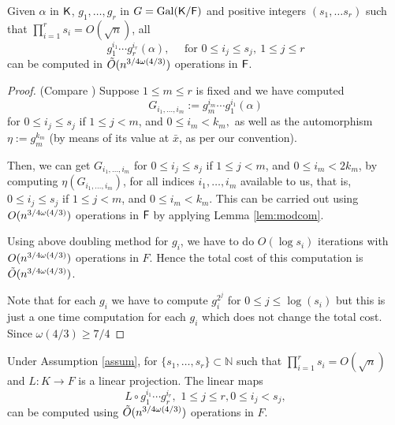 \begin{lemma}\label{lem:selfcomp}
Given $\alpha$ in ${\mathsf{K}}$, $g_1, \ldots , g_{r}$ in $G =
\mathrm{Gal}({\mathsf{K}}/{\mathsf{F}})$ and positive integers $(s_1, \ldots s_r)$ such
that $\prod_{i = 1}^r s_i = O(\sqrt{n})$, all
  $$g_1^{i_1}\cdots g_r^{i_r}(\alpha) ,\quad \text{~for~} 0 \leq i_j
\leq s_j,\ 1 \leq j \leq r$$ can be computed in $\tilde{O}(n^{3/4 \omega(4/3)})$
operations in ${\mathsf{F}}$.
\end{lemma}
\begin{proof}
(Compare \cite[Lemma~4]{KalSho98}) Suppose $1 \leq m \leq r$ is
  fixed and we have computed 
$$G_{i_1,\dots,i_m}:=g_m^{i_m}\cdots g_1^{i_1}(\alpha)$$ for $0 \leq
  i_j \leq s_j$ if $1 \leq j < m$, and $0 \leq i_m < k_m,$ as well as
  the automorphism $\eta:=g_m^{k_m}$ (by means of its value at $\bar
  x$, as per our convention).
  
 Then, we can get $G_{i_1,\dots,i_m}$ for $0 \leq i_j \leq s_j$ if $1
 \leq j < m$, and $0 \leq i_m < 2k_m$, by computing
 $\eta(G_{i_1,\dots,i_m})$, for all indices $i_1,\dots,i_m$
 available to us, that is, $0 \leq i_j \leq s_j$ if $1 \leq j < m$,
 and $0 \leq i_m < k_m$. This can be carried out using $O(n^{3/4 \omega(4/3)})$
 operations in ${\mathsf{F}}$ by applying Lemma \ref{lem:modcom}.

 Using above doubling method for $g_i$, we have to
 do $O(\log s_i)$ iterations with $O(n^{3/4 \omega(4/3)})$ operations in $F$. Hence
 the total cost of this computation is $\tilde{O}(n^{3/4 \omega(4/3)})$.

Note that for each $g_i$ we have to compute $g_i^{2^j}$ for $0 \leq j
\leq \log(s_i)$ but this is just a one time computation for each $g_i$
which does not change the total cost. Since $\omega(4/3) \ge 7/4$
\end{proof}

\begin{lemma}\label{lem:transmodcomp}
Under Assumption \ref{assum}, for $\lbrace s_1, \ldots, s_r \rbrace \subset \mathbb{N}$
such that $\prod_{i = 1}^r s_i = O(\sqrt{n})$
 and $L: K\rightarrow F$ is a linear projection. The linear maps
$$L \circ g_1^{i_1} \cdots g_r^{i_r}, \,\, 1\leq j \leq r, 0 \leq i_j < s_j, $$ can be computed using $\tilde{O}(n^{3/4 \omega(4/3)})$ operations in $F$. 
\end{lemma} 


